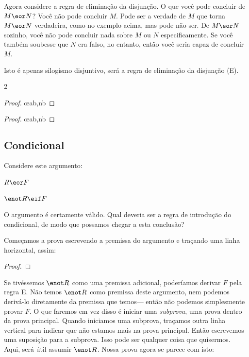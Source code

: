Agora considere a regra de eliminação da disjunção. O que você pode concluir de $M \eor N$? Você não pode concluir $M$. Pode ser a verdade de $M$ que torna $M \eor N$ verdadeira, como no exemplo acima, mas pode não ser. De $M \eor N$ sozinho, você não pode concluir nada sobre $M$ ou $N$ especificamente. Se você também soubesse que $N$ era falso, no entanto, então você seria capaz de concluir $M$.

Isto é apenas silogismo disjuntivo, será a regra de eliminação da disjunção ({\eor}E).
\begin{multicols}{2}
\begin{proof}
	 \oe{ab,nb}
\end{proof}

\begin{proof}
	 \oe{ab,nb}
\end{proof}

\end{multicols}

\subsection{Condicional}

Considere este argumento:
\begin{earg}
\item[] $R \eor F$
\item[\therefore] $\enot R \eif F$
\end{earg}
O argumento é certamente válido. Qual deveria ser a regra de introdução do condicional, de modo que possamos chegar a esta conclusão?

Começamos a prova escrevendo a premissa do argumento e traçando uma linha horizontal, assim:

\begin{proof}
\end{proof}

Se tivéssemos $\enot R$ como uma premissa adicional, poderíamos derivar $F$ pela regra {\eor}E. Não temos $\enot R$ como premissa deste argumento, nem podemos derivá-lo diretamente da premissa que temos--- então não podemos simplesmente provar $F$. O que faremos em vez disso é iniciar uma \emph{subprova}, uma prova dentro da prova principal. Quando iniciamos uma subprova, traçamos outra linha vertical para indicar que não estamos mais na prova principal. Então escrevemos uma suposição para a subprova. Isso pode ser qualquer coisa que quisermos. Aqui, será útil assumir $\enot R$. Nossa prova agora se parece com isto:


